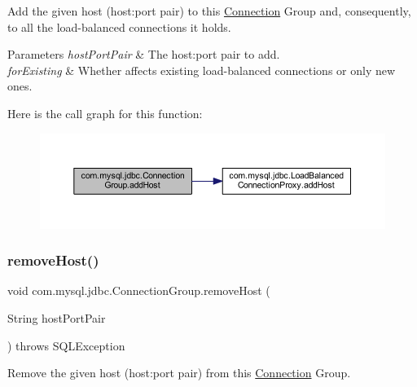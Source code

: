 Add the given host (host\+:port pair) to this \mbox{\hyperlink{interfacecom_1_1mysql_1_1jdbc_1_1_connection}{Connection}} Group and, consequently, to all the load-\/balanced connections it holds.


\begin{DoxyParams}{Parameters}
{\em host\+Port\+Pair} & The host\+:port pair to add. \\
\hline
{\em for\+Existing} & Whether affects existing load-\/balanced connections or only new ones. \\
\hline
\end{DoxyParams}
Here is the call graph for this function\+:\nopagebreak
\begin{figure}[H]
\begin{center}
\leavevmode
\includegraphics[width=350pt]{classcom_1_1mysql_1_1jdbc_1_1_connection_group_a26394f92e59f213c787876133b0a17e5_cgraph}
\end{center}
\end{figure}
\mbox{\label{classcom_1_1mysql_1_1jdbc_1_1_connection_group_ae0d6740efd41c535f64998acbf213a54}} 
\subsubsection{\texorpdfstring{remove\+Host()}{removeHost()}\hspace{0.1cm}{\footnotesize\ttfamily [1/3]}}
{\footnotesize\ttfamily void com.\+mysql.\+jdbc.\+Connection\+Group.\+remove\+Host (\begin{DoxyParamCaption}\item[{String}]{host\+Port\+Pair }\end{DoxyParamCaption}) throws S\+Q\+L\+Exception}

Remove the given host (host\+:port pair) from this \mbox{\hyperlink{interfacecom_1_1mysql_1_1jdbc_1_1_connection}{Connection}} Group.


